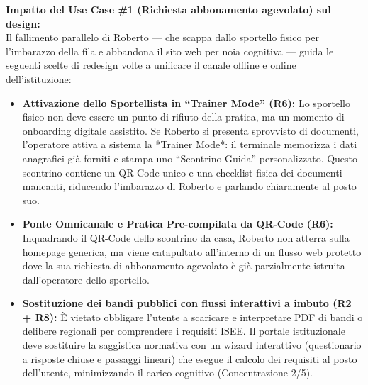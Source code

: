 \documentclass[11pt,a4paper]{article}
\begin{document}
\vspace{0.3cm}

\begin{tcolorbox}[colback=backgroundColor,colframe=borderColor,arc=2mm]
    {\small
    \textbf{Impatto del Use Case \#1 (Richiesta abbonamento agevolato) sul design:} \\[4pt]
    Il fallimento parallelo di Roberto --- che scappa dallo sportello fisico per l'imbarazzo della fila e abbandona il sito web per noia cognitiva --- guida le seguenti scelte di redesign volte a unificare il canale offline e online dell'istituzione:
    \begin{itemize}[leftmargin=*]
        \item \textbf{Attivazione dello Sportellista in ``Trainer Mode'' (R6):} Lo sportello fisico non deve essere un punto di rifiuto della pratica, ma un momento di onboarding digitale assistito. Se Roberto si presenta sprovvisto di documenti, l'operatore attiva a sistema la *Trainer Mode*: il terminale memorizza i dati anagrafici già forniti e stampa uno ``Scontrino Guida'' personalizzato. Questo scontrino contiene un QR-Code unico e una checklist fisica dei documenti mancanti, riducendo l'imbarazzo di Roberto e parlando chiaramente al posto suo.
        \item \textbf{Ponte Omnicanale e Pratica Pre-compilata da QR-Code (R6):} Inquadrando il QR-Code dello scontrino da casa, Roberto non atterra sulla homepage generica, ma viene catapultato all'interno di un flusso web protetto dove la sua richiesta di abbonamento agevolato è già parzialmente istruita dall'operatore dello sportello.
        \item \textbf{Sostituzione dei bandi pubblici con flussi interattivi a imbuto (R2 + R8):} È vietato obbligare l'utente a scaricare e interpretare PDF di bandi o delibere regionali per comprendere i requisiti ISEE. Il portale istituzionale deve sostituire la saggistica normativa con un wizard interattivo (questionario a risposte chiuse e passaggi lineari) che esegue il calcolo dei requisiti al posto dell'utente, minimizzando il carico cognitivo (Concentrazione 2/5).
    \end{itemize}
    }
\end{tcolorbox}
\end{document}

